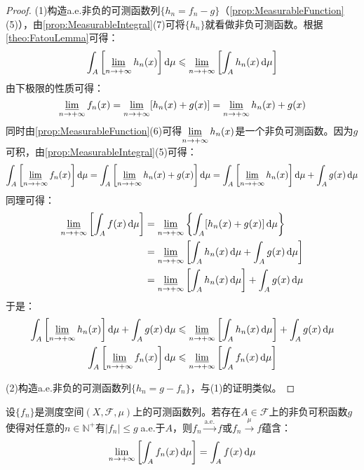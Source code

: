 \begin{proof}
	(1)构造a.e.非负的可测函数列$\{h_n=f_n-g\}$（\cref{prop:MeasurableFunction}(5)），由\cref{prop:MeasurableIntegral}(7)可将$\{h_n\}$就看做非负可测函数。根据\cref{theo:FatouLemma}可得：
	\begin{equation*}
		\int_{A}\left[\varliminf_{n\to+\infty}h_n(x)\right]\mathop{}\!\mathrm{d}\mu\leqslant\varliminf_{n\to+\infty}\left[\int_{A}h_n(x)\mathop{}\!\mathrm{d}\mu\right]
	\end{equation*}
	由下极限的性质可得：
	\begin{equation*}
		\varliminf_{n\to+\infty}f_n(x)=\varliminf_{n\to+\infty}[h_n(x)+g(x)]=\varliminf_{n\to+\infty}h_n(x)+g(x)
	\end{equation*}
	同时由\cref{prop:MeasurableFunction}(6)可得$\varliminf\limits_{n\to+\infty}h_n(x)$是一个非负可测函数。因为$g$可积，由\cref{prop:MeasurableIntegral}(5)可得：
	\begin{equation*}
		\int_{A}\left[\varliminf_{n\to+\infty}f_n(x)\right]\mathop{}\!\mathrm{d}\mu=\int_{A}\left[\varliminf_{n\to+\infty}h_n(x)+g(x)\right]\mathop{}\!\mathrm{d}\mu=\int_{A}\left[\varliminf_{n\to+\infty}h_n(x)\right]\mathop{}\!\mathrm{d}\mu+\int_{A}g(x)\mathop{}\!\mathrm{d}\mu
	\end{equation*}
	同理可得：
	\begin{align*}
		\varliminf_{n\to+\infty}\left[\int_{A}f(x)\mathop{}\!\mathrm{d}\mu\right]&=\varliminf_{n\to+\infty}\left\{\int_{A}[h_n(x)+g(x)]\mathop{}\!\mathrm{d}\mu\right\} \\
		&=\varliminf_{n\to+\infty}\left[\int_{A}h_n(x)\mathop{}\!\mathrm{d}\mu+\int_{A}g(x)\mathop{}\!\mathrm{d}\mu\right] \\
		&=\varliminf_{n\to+\infty}\left[\int_{A}h_n(x)\mathop{}\!\mathrm{d}\mu\right]+\int_{A}g(x)\mathop{}\!\mathrm{d}\mu
	\end{align*}
	于是：
	\begin{gather*}
		\int_{A}\left[\varliminf_{n\to+\infty}h_n(x)\right]\mathop{}\!\mathrm{d}\mu+\int_{A}g(x)\mathop{}\!\mathrm{d}\mu\leqslant\varliminf_{n\to+\infty}\left[\int_{A}h_n(x)\mathop{}\!\mathrm{d}\mu\right]+\int_{A}g(x)\mathop{}\!\mathrm{d}\mu \\
		\int_{A}\left[\varliminf_{n\to+\infty}f_n(x)\right]\mathop{}\!\mathrm{d}\mu\leqslant\varliminf_{n\to+\infty}\left[\int_{A}f_n(x)\mathop{}\!\mathrm{d}\mu\right]
	\end{gather*}\par
	(2)构造a.e.非负的可测函数列$\{h_n=g-f_n\}$，与(1)的证明类似。
\end{proof}
\begin{theorem}[Lebesgue控制收敛定理]\label{theo:DominatedConvergenceTheorem}
	设$\{f_n\}$是测度空间$(X,\mathscr{F},\mu)$上的可测函数列。若存在$A\in\mathscr{F}$上的非负可积函数$g$使得对任意的$n\in\mathbb{N}^+$有$|f_n|\leqslant g\;$a.e.于$A$，则$f_n\overset{\text{a.e.}}{\longrightarrow}f$或$f_n\overset{\mu}{\longrightarrow}f$蕴含：
	\begin{equation*}
		\lim_{n\to+\infty}\left[\int_{A}f_n(x)\mathop{}\!\mathrm{d}\mu\right]=\int_{A}f(x)\mathop{}\!\mathrm{d}\mu
	\end{equation*}
\end{theorem}
